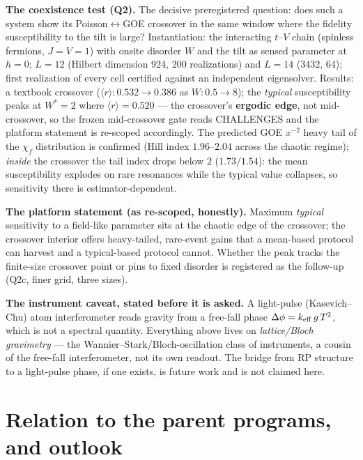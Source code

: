\documentclass[11pt]{article}
\newcommand{\rmean}{\langle r\rangle}
\newcommand{\chif}{\chi_{f}}
\begin{document}
\textbf{The coexistence test (Q2).} The decisive preregistered question: does such a system show
its Poisson$\leftrightarrow$GOE crossover in the same window where the fidelity susceptibility to
the tilt is large? Instantiation: the interacting $t$--$V$ chain (spinless fermions, $J=V=1$) with
onsite disorder $W$ and the tilt as sensed parameter at $h=0$; $L=12$ (Hilbert dimension 924, 200
realizations) and $L=14$ (3432, 64); first realization of every cell certified against an
independent eigensolver. Results: a textbook crossover ($\rmean: 0.532 \to 0.386$ as $W: 0.5\to8$);
the \emph{typical} susceptibility peaks at $W^{*}=2$ where $\rmean = 0.520$ --- the crossover's
\textbf{ergodic edge}, not mid-crossover, so the frozen mid-crossover gate reads CHALLENGES and the
platform statement is re-scoped accordingly. The predicted GOE $x^{-2}$ heavy tail of the $\chif$
distribution is confirmed (Hill index $1.96$--$2.04$ across the chaotic regime); \emph{inside} the
crossover the tail index drops below $2$ ($1.73/1.54$): the mean susceptibility explodes on rare
resonances while the typical value collapses, so sensitivity there is estimator-dependent.

\textbf{The platform statement (as re-scoped, honestly).} Maximum \emph{typical} sensitivity to a
field-like parameter sits at the chaotic edge of the crossover; the crossover interior offers
heavy-tailed, rare-event gains that a mean-based protocol can harvest and a typical-based protocol
cannot. Whether the peak tracks the finite-size crossover point or pins to fixed disorder is
registered as the follow-up (Q2c, finer grid, three sizes).

\textbf{The instrument caveat, stated before it is asked.} A light-pulse (Kasevich--Chu) atom
interferometer reads gravity from a free-fall phase $\Delta\phi = k_{\rm eff}\,g\,T^{2}$, which is
not a spectral quantity. Everything above lives on \emph{lattice/Bloch gravimetry} --- the
Wannier--Stark/Bloch-oscillation class of instruments, a cousin of the free-fall interferometer,
not its own readout. The bridge from RP structure to a light-pulse phase, if one exists, is future
work and is not claimed here.

\section{Relation to the parent programs, and outlook}
\label{sec:outlook}
\end{document}

